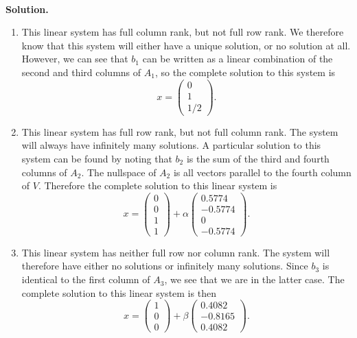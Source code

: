\documentclass[11pt]{article}
\begin{document}
\

\noindent \textbf{Solution. }
\begin{enumerate}
\item This linear system has full column rank, but not full row rank. We therefore know that this system will either have a unique solution, or no solution at all. However, we can see that $b_1$ can be written as a linear combination of the second and third columns of $A_1$, so the complete solution to this system is 
$$\boxed{x = \begin{pmatrix} 0 \\ 1 \\ 1/2 \end{pmatrix}.}$$
\item This linear system has full row rank, but not full column rank. The system will always have infinitely many solutions. A particular solution to this system can be found by noting that $b_2$ is the sum of the third and fourth columns of $A_2$. The nullspace of $A_2$ is all vectors parallel to the fourth column of $V$. Therefore the complete solution to this linear system is 
$$\boxed{x = \begin{pmatrix} 0 \\ 0 \\ 1 \\ 1 \end{pmatrix} + \alpha \begin{pmatrix} 0.5774 \\ -0.5774 \\ 0 \\ -0.5774 \end{pmatrix}.}$$
\item This linear system has neither full row nor column rank. The system will therefore have either no solutions or infinitely many solutions. Since $b_3$ is identical to the first column of $A_3$, we see that we are in the latter case. The complete solution to this linear system is then
$$\boxed{x = \begin{pmatrix} 1 \\ 0 \\ 0 \end{pmatrix} + \beta \begin{pmatrix} 0.4082 \\ -0.8165 \\ 0.4082 \end{pmatrix}.}$$
\end{enumerate}
\end{document}
